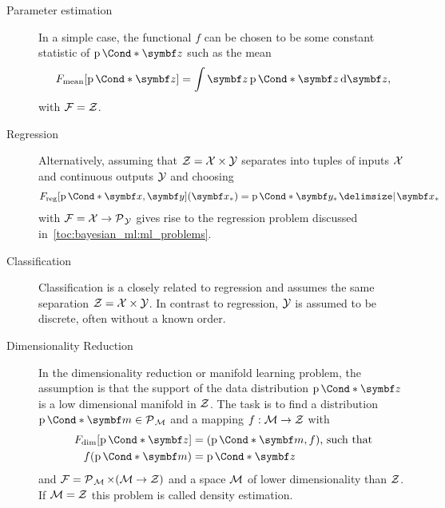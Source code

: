 \begin{problem}
\begin{description}
    \item[Parameter estimation]
          In a simple case, the functional $f$ can be chosen to be some constant statistic of $\Prob*{\mat{z}}$ such as the mean
          \begin{align}
              F_{\text{mean}}[\Prob*{\mat{z}}] = \int \mat{z} \Prob*{\mat{z}} \diff \mat{z},
          \end{align}
          with $\mathcal{F} = \mathcal{Z}$.
    \item[Regression]
          Alternatively, assuming that $\mathcal{Z} = \mathcal{X} \times \mathcal{Y}$ separates into tuples of inputs $\mathcal{X}$ and continuous outputs $\mathcal{Y}$ and choosing
          \begin{align}
              \label{eq:bayesian_ml:f_reg}
              F_{\text{reg}}[\Prob*{\mat{x}, \mat{y}}](\mat{x_\ast}) = \Prob*{\mat{y_\ast} \given \mat{x_\ast}}
          \end{align}
          with $\mathcal{F} = \mathcal{X} \to \operatorname{\mathcal{P}\mkern1mu}_{\mathcal{Y}}$ gives rise to the regression problem discussed in~\cref{toc:bayesian_ml:ml_problems}.
    \item[Classification]
          Classification is a closely related to regression and assumes the same separation $\mathcal{Z} = \mathcal{X} \times \mathcal{Y}$.
          In contrast to regression, $\mathcal{Y}$ is assumed to be discrete, often without a known order.
    \item[Dimensionality Reduction]
          In the dimensionality reduction or manifold learning problem, the assumption is that the support of the data distribution $\Prob*{\mat{z}}$ is a low dimensional manifold in $\mathcal{Z}$.
          The task is to find a distribution $\Prob*{\mat{m}} \in \Probs{\Mc}$ and a mapping $f : \mathcal{M} \to \mathcal{Z}$ with
          \begin{align}
              \begin{split}
                  F_{\text{dim}}[\Prob*{\mat{z}}] & = (\Prob*{\mat{m}}, f)\text{, such that} \\
                  f(\Prob*{\mat{m}})              & = \Prob*{\mat{z}}
              \end{split}
          \end{align}
          and $\mathcal{F} = \operatorname{\mathcal{P}\mkern1mu}_{\mathcal{M}} \times (\mathcal{M} \to \mathcal{Z})$ and a space $\mathcal{M}$ of lower dimensionality than $\mathcal{Z}$.
          If $\mathcal{M} = \mathcal{Z}$ this problem is called density estimation.
\end{description}
\end{problem}

